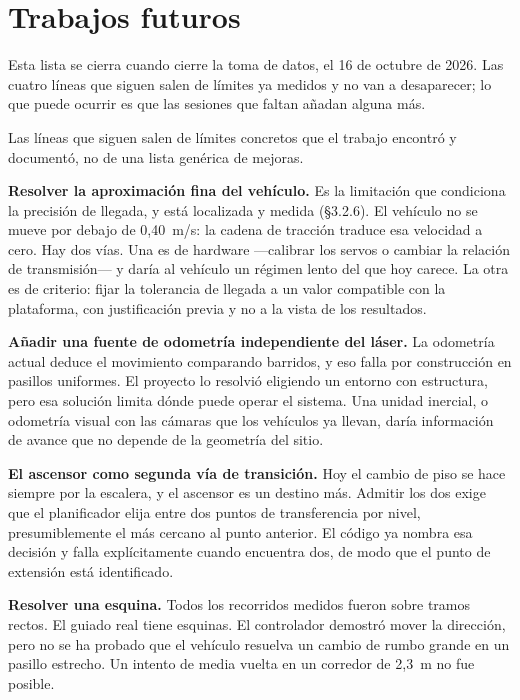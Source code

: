 \chapter*{Trabajos futuros}

\begin{notaavance}
Esta lista se cierra cuando cierre la toma de datos, el 16 de octubre de 2026.
Las cuatro líneas que siguen salen de límites ya medidos y no van a
desaparecer; lo que puede ocurrir es que las sesiones que faltan añadan alguna
más.
\end{notaavance}

Las líneas que siguen salen de límites concretos que el trabajo encontró y
documentó, no de una lista genérica de mejoras.

\textbf{Resolver la aproximación fina del vehículo.} Es la limitación que
condiciona la precisión de llegada, y está localizada y medida (§3.2.6). El
vehículo no se mueve por debajo de 0,40~m/s: la cadena de tracción traduce esa
velocidad a cero. Hay
dos vías. Una es de hardware —calibrar los servos o cambiar la relación de
transmisión— y daría al vehículo un régimen lento del que hoy carece. La otra es
de criterio: fijar la tolerancia de llegada a un valor compatible con la
plataforma, con justificación previa y no a la vista de los resultados.

\textbf{Añadir una fuente de odometría independiente del láser.} La odometría
actual deduce el movimiento comparando barridos, y eso falla por construcción en
pasillos uniformes. El proyecto lo resolvió eligiendo un entorno con estructura,
pero esa solución limita dónde puede operar el sistema. Una unidad inercial, o
odometría visual con las cámaras que los vehículos ya llevan, daría información
de avance que no depende de la geometría del sitio.

\textbf{El ascensor como segunda vía de transición.} Hoy el cambio de piso se
hace siempre por la escalera, y el ascensor es un destino más. Admitir los dos
exige que el planificador elija entre dos puntos de transferencia por nivel,
presumiblemente el más cercano al punto anterior. El código ya nombra esa
decisión y falla explícitamente cuando encuentra dos, de modo que el punto de
extensión está identificado.

\textbf{Resolver una esquina.} Todos los recorridos medidos fueron sobre tramos
rectos. El guiado real tiene esquinas. El controlador demostró mover la dirección, pero
no se ha probado que el vehículo resuelva un cambio de rumbo grande en un pasillo
estrecho. Un intento de media vuelta en un corredor de 2,3~m no fue
posible.

